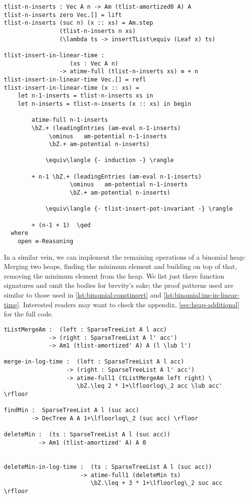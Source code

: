 \begin{lstlisting}[caption={$n$ inserts in linear time},label={lst:binomial:ins-in-linear-time},emph={tlist,insert,inserts,n,in,linear,time,insertTList,am,leadingEntries,potential}]
tlist-n-inserts : Vec A n -> Am (tlist-amortized0 A) A
tlist-n-inserts zero Vec.[] = lift
tlist-n-inserts (suc n) (x :: xs) = Am.step
                (tlist-n-inserts n xs)
                (\lambda ts -> insertTList\equiv (Leaf x) ts)

tlist-insert-in-linear-time :
                   (xs : Vec A n)
                -> atime-full (tlist-n-inserts xs) ≡ + n
tlist-insert-in-linear-time Vec.[] = refl
tlist-insert-in-linear-time (x :: xs) =
    let n-1-inserts = tlist-n-inserts xs in
    let n-inserts = tlist-n-inserts (x :: xs) in begin

        atime-full n-1-inserts
        \bZ.+ (leadingEntries (am-eval n-1-inserts)
             \ominus   am-potential n-1-inserts
             \bZ.+ am-potential n-inserts)

            \equiv\langle {- induction -} \rangle

        + n-1 \bZ.+ (leadingEntries (am-eval n-1-inserts)
                   \ominus   am-potential n-1-inserts
                   \bZ.+ am-potential n-inserts)

            \equiv\langle {- tlist-insert-pot-invariant -} \rangle

        + (n-1 + 1)  \qed
  where
    open ≡-Reasoning
\end{lstlisting}

In a similar vein, we can implement the remaining operations of a binomial heap: Merging two heaps, finding the minimum element and building on top of that, removing the minimum element from the heap. We list just there function signatures and omit the bodies for brevity's sake; the proof patterns used are similar to those used in \autoref{lst:binomial:constinsert} and \autoref{lst:binomial:ins-in-linear-time}. Interested readers may want to check the appendix, \autoref{sec:heap-additional} for the full code.

\begin{lstlisting}[caption={Remaining heap operations},label={lst:binomial:remaining},emph={SparseTreeList,tListMergeAm,merge,in,log,time,findMin,deleteMin}]
tListMergeAm :  (left : SparseTreeList A l acc)
             -> (right : SparseTreeList A l' acc')
             -> Am1 (tlist-amortized' A) A (l \lub l')

merge-in-log-time :  (left : SparseTreeList A l acc)
                  -> (right : SparseTreeList A l' acc')
                  -> atime-full1 (tListMergeAm left right) \
                     \bZ.\leq 2 * 1+\lfloorlog\_2 acc \lub acc' \rfloor

findMin :  SparseTreeList A l (suc acc)
        -> DecTree A A 1+\lfloorlog\_2 (suc acc) \rfloor

deleteMin :  (ts : SparseTreeList A l (suc acc))
          -> Am1 (tlist-amortized' A) A 0


deleteMin-in-log-time :  (ts : SparseTreeList A l (suc acc))
                      -> atime-full1 (deleteMin ts)
                         \bZ.\leq + 3 * 1+\lfloorlog\_2 suc acc \rfloor

\end{lstlisting}
